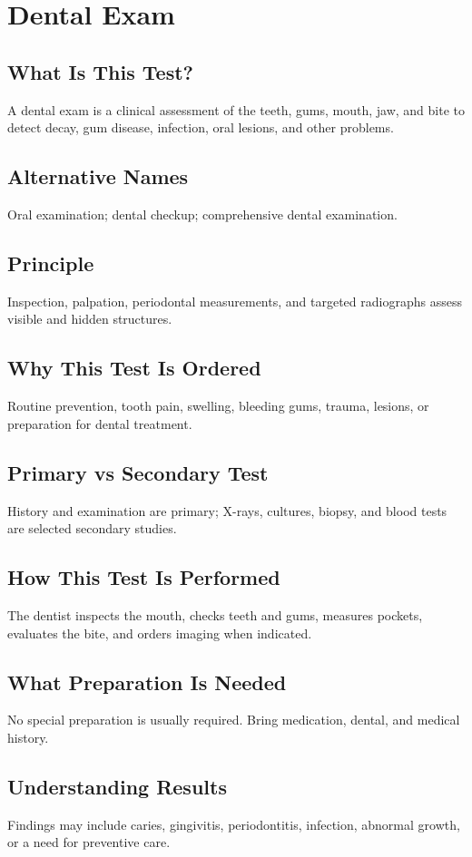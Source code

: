 \chapter{Dental Exam}
\section*{What Is This Test?} A dental exam is a clinical assessment of the teeth, gums, mouth, jaw, and bite to detect decay, gum disease, infection, oral lesions, and other problems.
\section*{Alternative Names} Oral examination; dental checkup; comprehensive dental examination.
\section*{Principle} Inspection, palpation, periodontal measurements, and targeted radiographs assess visible and hidden structures.
\section*{Why This Test Is Ordered} Routine prevention, tooth pain, swelling, bleeding gums, trauma, lesions, or preparation for dental treatment.
\section*{Primary vs Secondary Test} History and examination are primary; X-rays, cultures, biopsy, and blood tests are selected secondary studies.
\section*{How This Test Is Performed} The dentist inspects the mouth, checks teeth and gums, measures pockets, evaluates the bite, and orders imaging when indicated.
\section*{What Preparation Is Needed} No special preparation is usually required. Bring medication, dental, and medical history.
\section*{Understanding Results} Findings may include caries, gingivitis, periodontitis, infection, abnormal growth, or a need for preventive care.
